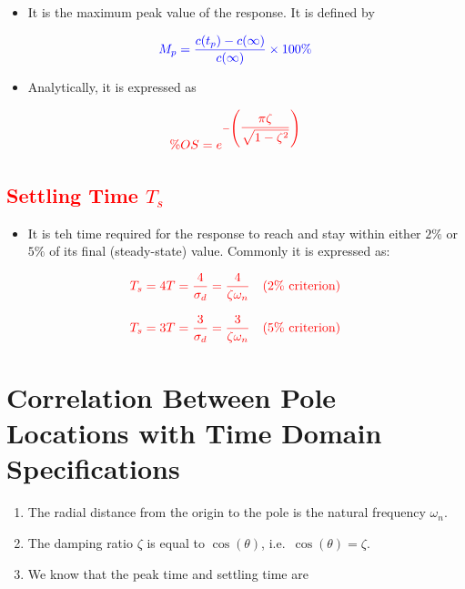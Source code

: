 \documentclass[
  14pt,
  a4paper,
  oneside,
  open=any,
  a4paper,
  14pt]{report}
\providecommand{\tightlist}{%
  \setlength{\itemsep}{0pt}\setlength{\parskip}{0pt}}\usepackage{longtable,booktabs,array}
\begin{document}
\begin{itemize}
\tightlist
\item
  It is the maximum peak value of the response. It is defined by
\end{itemize}

\[
    \textcolor{blue}{M_p = \dfrac{c(t_p)-c(\infty)}{c(\infty)} \times 100\%}
\]

\begin{itemize}
\tightlist
\item
  Analytically, it is expressed as
\end{itemize}

\[
    \textcolor{red}{\%OS = e^{-\left(\dfrac{\pi\zeta}{\sqrt{1-\zeta^2}}\right)}}
\]

\subsection{\texorpdfstring{\textcolor{red}{Settling Time
\(T_s\)}}{Settling Time T\_s}}\label{settling-time-t_s-1}

\begin{itemize}
\tightlist
\item
  It is teh time required for the response to reach and stay within
  either \(2\%\) or \(5\%\) of its final (steady-state) value. Commonly
  it is expressed as:
\end{itemize}

\[
    \textcolor{red}{T_s = 4T = \dfrac{4}{\sigma_d} = \dfrac{4}{\zeta \omega_n} \quad \text{(2\% criterion)}} 
\]

\[
    \textcolor{red}{T_s = 3T = \dfrac{3}{\sigma_d} = \dfrac{3}{\zeta \omega_n} \quad \text{(5\% criterion)}}
\]

\section{Correlation Between Pole Locations with Time Domain
Specifications}\label{correlation-between-pole-locations-with-time-domain-specifications}

\begin{enumerate}
\def\labelenumi{\arabic{enumi}.}
\item
  The radial distance from the origin to the pole is the natural
  frequency \(\omega_n\).
\item
  The damping ratio \(\zeta\) is equal to \(\cos(\theta)\),
  i.e.~\(\cos(\theta) = \zeta\).
\item
  We know that the peak time and settling time are
\end{enumerate}
\end{document}
